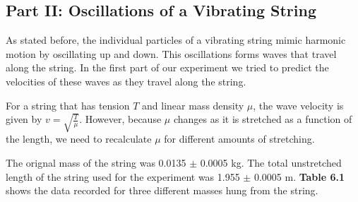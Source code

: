 \documentclass[11pt]{report}
\begin{document}






\subsection*{Part II: Oscillations of a Vibrating String}

As stated before, the individual particles of a vibrating string mimic harmonic
motion by oscillating up and down.  This oscillations forms waves that travel
along the string. In the first part of our experiment we tried to predict the 
velocities of these waves as they travel along the string. 

For a string that has tension \(T\) and linear mass density \(\mu\), the wave
velocity is given by \(v = \sqrt{\frac{T}{\mu}}\).  However, because $\mu$
changes as it is stretched as a function of the length, we need to recalculate 
$\mu$ for different amounts of stretching.  

The orignal mass of the string was 0.0135 $\pm$ 0.0005 kg.  The total
unstretched length of the string used for the experiment was 1.955 $\pm$ 0.0005 m.
\textbf{Table 6.1} shows the data recorded for three different masses hung from
the string.
\end{document}
